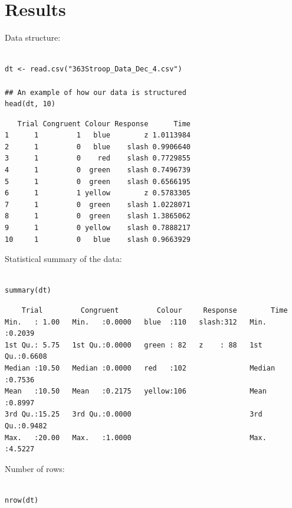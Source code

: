 \documentclass{article}
\begin{document}
\section{Results}
\label{sec:org87222ac}

Data structure:

\begin{verbatim}

dt <- read.csv("363Stroop_Data_Dec_4.csv")

## An example of how our data is structured
head(dt, 10)

\end{verbatim}

\begin{verbatim}
   Trial Congruent Colour Response      Time
1      1         1   blue        z 1.0113984
2      1         0   blue    slash 0.9906640
3      1         0    red    slash 0.7729855
4      1         0  green    slash 0.7496739
5      1         0  green    slash 0.6566195
6      1         1 yellow        z 0.5783305
7      1         0  green    slash 1.0228071
8      1         0  green    slash 1.3865062
9      1         0 yellow    slash 0.7888217
10     1         0   blue    slash 0.9663929
\end{verbatim}

Statistical summary of the data:

\begin{verbatim}

summary(dt)

\end{verbatim}

\begin{verbatim}
    Trial         Congruent         Colour     Response        Time       
Min.   : 1.00   Min.   :0.0000   blue  :110   slash:312   Min.   :0.2039  
1st Qu.: 5.75   1st Qu.:0.0000   green : 82   z    : 88   1st Qu.:0.6608  
Median :10.50   Median :0.0000   red   :102               Median :0.7536  
Mean   :10.50   Mean   :0.2175   yellow:106               Mean   :0.8997  
3rd Qu.:15.25   3rd Qu.:0.0000                            3rd Qu.:0.9482  
Max.   :20.00   Max.   :1.0000                            Max.   :4.5227
\end{verbatim}

Number of rows:

\begin{verbatim}

nrow(dt)

\end{verbatim}
\end{document}
